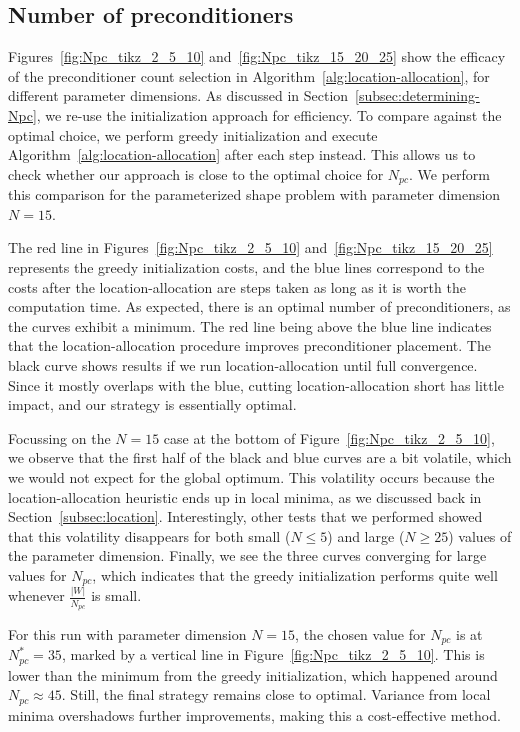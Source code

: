 \subsection{Number of preconditioners}\label{subsec:Npc_experiment}
Figures~\ref{fig:Npc_tikz_2_5_10} and~\ref{fig:Npc_tikz_15_20_25} show the efficacy of the preconditioner count selection in Algorithm~\ref{alg:location-allocation}, for different parameter dimensions.
As discussed in Section~\ref{subsec:determining-Npc}, we re-use the initialization approach for efficiency.
To compare against the optimal choice, we perform greedy initialization and execute Algorithm~\ref{alg:location-allocation} after each step instead.
This allows us to check whether our approach is close to the optimal choice for $N_{pc}$.
We perform this comparison for the parameterized shape problem with parameter dimension $N=15$.

The red line in Figures~\ref{fig:Npc_tikz_2_5_10} and~\ref{fig:Npc_tikz_15_20_25} represents the greedy initialization costs, and the blue lines correspond to the costs after the location-allocation are steps taken as long as it is worth the computation time.
As expected, there is an optimal number of preconditioners, as the curves exhibit a minimum.
The red line being above the blue line indicates that the location-allocation procedure improves preconditioner placement.
The black curve shows results if we run location-allocation until full convergence.
Since it mostly overlaps with the blue, cutting location-allocation short has little impact, and our strategy is essentially optimal.

Focussing on the $N=15$ case at the bottom of Figure~\ref{fig:Npc_tikz_2_5_10}, we observe that the first half of the black and blue curves are a bit volatile, which we would not expect for the global optimum.
This volatility occurs because the location-allocation heuristic ends up in local minima, as we discussed back in Section~\ref{subsec:location}.
Interestingly, other tests that we performed showed that this volatility disappears for both small ($N \leq 5$) and large ($N \geq 25$) values of the parameter dimension.
Finally, we see the three curves converging for large values for $N_{pc}$, which indicates that the greedy initialization performs quite well whenever $\frac{|W|}{N_{pc}}$ is small.

For this run with parameter dimension $N=15$, the chosen value for $N_{pc}$ is at $N_{pc}^*=35$, marked by a vertical line in Figure~\ref{fig:Npc_tikz_2_5_10}.
This is lower than the minimum from the greedy initialization, which happened around $N_{pc}\approx 45$.
Still, the final strategy remains close to optimal.
Variance from local minima overshadows further improvements, making this a cost-effective method.

